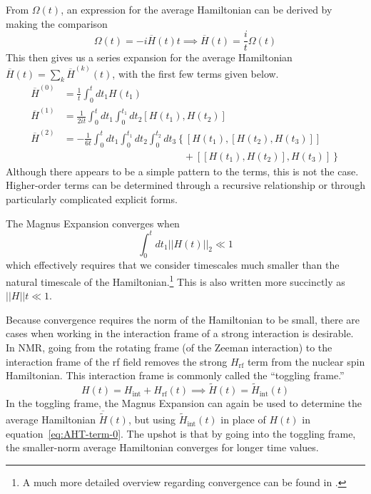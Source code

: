 From $\Omega(t)$, an expression for the average Hamiltonian can be derived by making the comparison
\[
\Omega(t) = -i \overline{H}(t) t \implies \overline{H}(t) = \frac{i}{t} \Omega(t)
\]
This then gives us a series expansion for the average Hamiltonian $\overline{H}(t) = \sum_k \overline{H}^{(k)}(t)$, with the first few terms given below.
\begin{align}
    \label{eq:AHT-term-0}
    \overline{H}^{(0)} &= \frac{1}{t} \int_0^{t} dt_1 H(t_1) \\
    \label{eq:AHT-term-1}
    \overline{H}^{(1)} &= \frac{1}{2it} \int_0^{t} dt_1 \int_0^{t_1} dt_2
        \left[H(t_1), H(t_2)\right] \\
    \label{eq:AHT-term-2}
    \overline{H}^{(2)} &= -\frac{1}{6t}
    \int_0^{t} dt_1 \int_0^{t_1} dt_2 \int_0^{t_2} dt_3
    \left\{
    \left[H(t_1), \left[H(t_2), H(t_3)\right]\right] \right. \\
    & \hspace{12em} + \left.
    \left[\left[H(t_1), H(t_2)\right], H(t_3)\right]
    \right\}
\end{align}
Although there appears to be a simple pattern to the terms, this is not the case. Higher-order terms can be determined through a recursive relationship or through particularly complicated explicit forms.

The Magnus Expansion converges when
\begin{equation}\label{eq:AHT-convergence}
    \int_0^t dt_1 ||H(t)||_2 \ll 1
\end{equation}
which effectively requires that we consider timescales much smaller than the natural timescale of the Hamiltonian.\footnote{A much more detailed overview regarding convergence can be found in \cite{Blanes_2009}.} This is also written more succinctly as $||H||t \ll 1$.

Because convergence requires the norm of the Hamiltonian to be small, there are cases when working in the interaction frame of a strong interaction is desirable. In NMR, going from the rotating frame (of the Zeeman interaction) to the interaction frame of the rf field removes the strong $H_\text{rf}$ term from the nuclear spin Hamiltonian. This interaction frame is commonly called the ``toggling frame.''
\[
H(t) = H_{\text{int}} + H_{\text{rf}}(t) \implies \widetilde{H}(t) = \widetilde{H}_{\text{int}}(t)
\]
In the toggling frame, the Magnus Expansion can again be used to determine the average Hamiltonian $\overline{\widetilde{H}}(t)$, but using $\widetilde{H}_{\text{int}}(t)$ in place of $H(t)$ in equation~\ref{eq:AHT-term-0}. The upshot is that by going into the toggling frame, the smaller-norm average Hamiltonian converges for longer time values.

